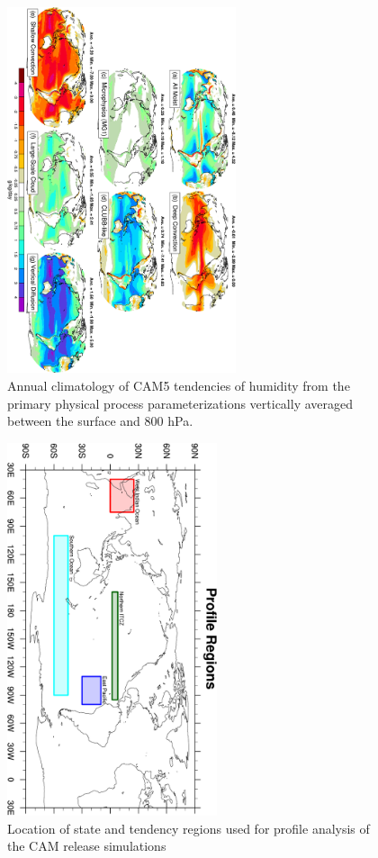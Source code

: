 \clearpage
\begin{figure}[t]
  \begin{center}
    \includegraphics[width=0.6\textwidth,angle=90.]{./figs/f_dqdt_pbl_2d_cam5_ann.pdf}
  \end{center}
  \caption{Annual climatology of CAM5 tendencies of humidity from the primary physical process parameterizations vertically averaged between the surface and 800 hPa.} 
\label{f_dqdt_pbl_2d_cam5_ann}
\end{figure} 
\clearpage
\begin{figure}[t]
  \begin{center}
    \includegraphics[width=0.55\textwidth,angle=90.]{./figs/f_prof_regions.pdf}
  \end{center}
  \caption{Location of state and tendency regions used for profile analysis of the CAM release simulations} 
\label{f_prof_regions}
\end{figure} 
